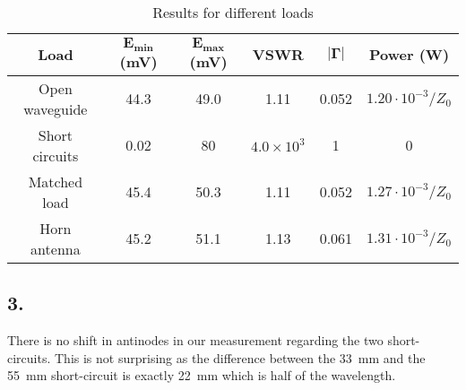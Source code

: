 	
	\begin{table}[]
	\centering
	\label{vswr_rfc_power}
	\begin{tabular}{|c|c|c|c|c|c|}
	\hline 
	\textbf{Load}           & $\boldsymbol{E_{min}}$ (mV) & $\boldsymbol{E_{max}}$ (mV) & \textbf{VSWR}             & $\boldsymbol{|\Gamma|}$ & \textbf{Power} (W) \\
\hline
	Open waveguide & 44.3           &  49.0          &  1.11            &     0.052       &   $1.20 \cdot 10^{-3} / Z_0 $   \\
\hline
	Short circuits & 0.02           & 80             & $4.0\times 10^3$ &      1      &   0    \\
\hline			
	Matched load   & 45.4           & 50.3           & 1.11             &     0.052       &   $1.27 \cdot 10^{-3} / Z_0 $   \\
\hline
	Horn antenna   & 45.2           & 51.1           & 1.13             &      0.061      &  $1.31 \cdot 10^{-3} / Z_0 $  \\ 

\hline
	\end{tabular}
	\caption{Results for different loads}
	\end{table}



	
	\subsection*{3.}
	There is no shift in antinodes in our measurement regarding the two short-circuits. This is not surprising as the difference between the 33~mm and the 55~mm short-circuit is exactly 22~mm which is half of the wavelength.

